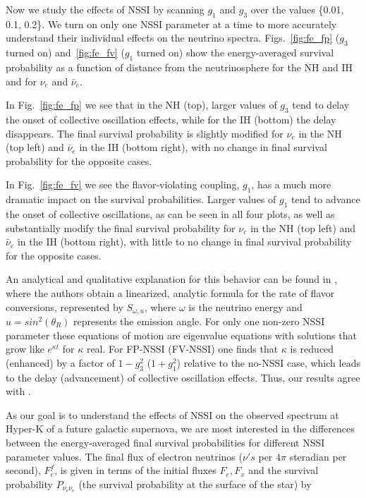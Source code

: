 \documentclass[a4paper,12pt]{article}
\begin{document}
Now we study the effects of NSSI by scanning $g_1$ and $g_3$ over the values \{0.01, 0.1, 0.2\}. We turn on only one NSSI parameter at a time to more accurately understand their individual effects on the neutrino spectra. Figs.~\ref{fig:fe_fp} ($g_{3}$ turned on) and~\ref{fig:fe_fv} ($g_{1}$ turned on) show the energy-averaged survival probability as a function of distance from the neutrinosphere for the NH and IH and for $\nu_{e}$ and $\bar{\nu}_{e}$.

In Fig.~\ref{fig:fe_fp} we see that in the NH (top), larger values of $g_{3}$ tend to delay the onset of collective oscillation effects, while for the IH (bottom) the delay disappears. The final survival probability is slightly modified for $\nu_{e}$ in the NH (top left) and $\bar{\nu}_{e}$ in the IH (bottom right), with no change in final survival probability for the opposite cases.

In Fig.~\ref{fig:fe_fv} we see the flavor-violating coupling, $g_{1}$, has a much more dramatic impact on the survival probabilities. Larger values of $g_{1}$ tend to advance the onset of collective oscillations, as can be seen in all four plots, as well as substantially modify the final survival probability for $\nu_{e}$ in the NH (top left) and $\bar{\nu}_{e}$ in the IH (bottom right), with little to no change in final survival probability for the opposite cases.

An analytical and qualitative explanation for this behavior can be found in \cite{Dighe:2017sur}, where the authors obtain a linearized, analytic formula for the rate of flavor conversions, represented by $S_{\omega,u}$, where $\omega$ is the neutrino energy and $u = sin^{2}(\theta_{R})$ represents the emission angle. For only one non-zero NSSI parameter these equations of motion are eigenvalue equations with solutions that grow like $e^{\kappa t}$ for $\kappa$ real. For FP-NSSI (FV-NSSI) one finds that $\kappa$ is reduced (enhanced) by a factor of $1-g_{3}^{2}$ ($1+g_{1}^{2}$) relative to the no-NSSI case, which leads to the delay (advancement) of collective oscillation effects. Thus, our results agree with \cite{Dighe:2017sur}.

As our goal is to understand the effects of NSSI on the observed spectrum at Hyper-K of a future galactic supernova, we are most interested in the differences between the energy-averaged final survival probabilities for different NSSI parameter values. The final flux of electron neutrinos ($\nu's$ per $4\pi$ steradian per second), $F^{f}_{e}$, is given in terms of the initial fluxes $F_{e}, F_{x}$ and the survival probability $P_{\nu_{e}\nu_{e}}$ (the survival probability at the surface of the star)  by
\end{document}
